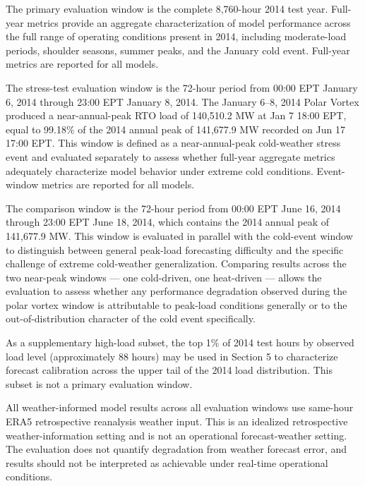 \documentclass[12pt,a4paper]{article}
\begin{document}
\begin{description}[leftmargin=!, labelwidth=4.8cm, itemsep=4pt]
\item[Full-year 2014 test set] The primary evaluation window is the complete 8,760-hour 2014 test year. Full-year metrics provide an aggregate characterization of model performance across the full range of operating conditions present in 2014, including moderate-load periods, shoulder seasons, summer peaks, and the January cold event. Full-year metrics are reported for all models.

\item[January 6--8, 2014 vortex window] The stress-test evaluation window is the 72-hour period from 00:00 EPT January 6, 2014 through 23:00 EPT January 8, 2014. The January 6–8, 2014 Polar Vortex produced a near-annual-peak RTO load of 140,510.2 MW at Jan 7 18:00 EPT, equal to 99.18\% of the 2014 annual peak of 141,677.9 MW recorded on Jun 17 17:00 EPT. This window is defined as a near-annual-peak cold-weather stress event and evaluated separately to assess whether full-year aggregate metrics adequately characterize model behavior under extreme cold conditions. Event-window metrics are reported for all models.
\item[June 16--18, 2014 summer window] The comparison window is the 72-hour period from 00:00 EPT June 16, 2014 through 23:00 EPT June 18, 2014, which contains the 2014 annual peak of 141,677.9 MW. This window is evaluated in parallel with the cold-event window to distinguish between general peak-load forecasting difficulty and the specific challenge of extreme cold-weather generalization. Comparing results across the two near-peak windows --- one cold-driven, one heat-driven --- allows the evaluation to assess whether any performance degradation observed during the polar vortex window is attributable to peak-load conditions generally or to the out-of-distribution character of the cold event specifically.
\item[Top 1\% load hours] As a supplementary high-load subset, the top 1\% of 2014 test hours by observed load level (approximately 88 hours) may be used in Section 5 to characterize forecast calibration across the upper tail of the 2014 load distribution. This subset is not a primary evaluation window.
\end{description}

All weather-informed model results across all evaluation windows use same-hour ERA5 retrospective reanalysis weather input. This is an idealized retrospective weather-information setting and is not an operational forecast-weather setting. The evaluation does not quantify degradation from weather forecast error, and results should not be interpreted as achievable under real-time operational conditions.
\end{document}
